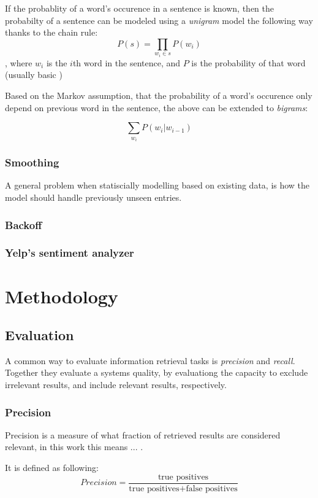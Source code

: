 \documentclass[a4paper,11pt]{kth-mag}
\newcommand{\todo}{ ... }
\begin{document}
If the probablity of a word's occurence in a sentence is known, then the probabilty of a sentence can be modeled using a \emph{unigram} model the following way thanks to the chain rule:
$$P(s) = \prod_{w_i \in s}P(w_i)$$, where $w_i$ is the $i$th word in the sentence, and $P$ is the probability of that word (usually basic )

Based on the Markov assumption, that the probability of a word's occurence only depend on previous word in the sentence, the above can be extended to \emph{bigrams}:

$$\sum_{w_i}P(w_i|w_{i-1})$$

\subsection{Smoothing}
A general problem when statiscially modelling based on existing data, is how the model should handle previously unseen entries.


\subsection{Backoff}

\subsection{Yelp's sentiment analyzer}

\chapter{Methodology}
\section{Evaluation}
A common way to evaluate information retrieval tasks is \emph{precision} and \emph{recall}. Together they evaluate a systems quality, by evaluationg the capacity to exclude irrelevant results, and include relevant results, respectively.

\subsection{Precision}
Precision is a measure of what fraction of retrieved results are considered relevant, in this work this means \todo.

It is defined as following:
$$Precision = \frac{\text {true positives}}{\text{true positives} + \text{false positives}}$$
\end{document}
